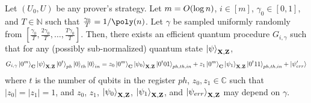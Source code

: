 \begin{lemma}\label{lem:partition}
Let $(U_0,U)$ be any prover's strategy. Let $m=O(\log n)$, $i\in[m]$, 
$\gamma_0 \in[0,1]$, and $T\in \mathbb{N}$ such that $\frac{\gamma_0}{T}=1/\poly(\secpar)$. Let $\gamma$ be sampled uniformly randomly from $[\frac{\gamma_0}{T},\frac{2\gamma_0}{T},\dots,\frac{T\gamma_0}{T}]$. Then, there exists an efficient quantum procedure $G_{i,\gamma}$ such that for any (possibly sub-normalized) quantum state $\ket{\psi}_{\mathbf{X},\mathbf{Z}}$,  
\begin{align*}
    G_{i,\gamma} \ket{0^m}_{\mathbf{C}}\ket{\psi}_{\mathbf{X},\mathbf{Z}}\ket{0^t}_{ph}\ket{0}_{th}\ket{0}_{in} = z_0\ket{0^m}_{\mathbf{C}}\ket{\psi_{0}}_{\mathbf{X},\mathbf{Z}}\ket{0^t01}_{ph,th,in}+ z_1\ket{0^m}_{\mathbf{C}}\ket{\psi_{1}}_{\mathbf{X},\mathbf{Z}}\ket{0^t11}_{ph,th,in} + \ket{\psi'_{err}}
\end{align*}
where $t$ is the number of qubits in the register $ph$, $z_0,z_1\in \mathbb{C}$ such that $|z_0|=|z_1|=1$, and 
$z_0$, $z_1$, $\ket{\psi_0}_{\mathbf{X},\mathbf{Z}}$, $\ket{\psi_1}_{\mathbf{X},\mathbf{Z}}$, and $\ket{\psi_{err}}_{\mathbf{X},\mathbf{Z}}$ may depend on $\gamma$.


\end{lemma}
